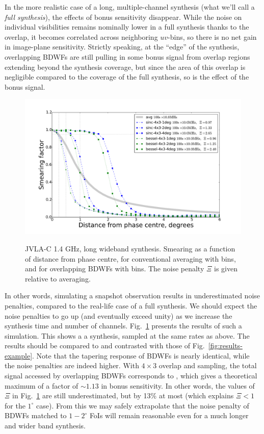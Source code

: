\documentclass[useAMS,usenatbib]{mn2e}
\begin{document}
In the more realistic case of a long, multiple-channel synthesis (what we'll call a \emph{full synthesis}), the
effects of bonus sensitivity disappear. While the noise on individual visibilities remains nominally lower in a full 
synthesis thanks to the overlap, it becomes correlated across neighboring $uv$-bins, so there is no net gain 
in image-plane sensitivity. Strictly speaking, at the ``edge'' of the synthesis, overlapping BDWFs are still pulling 
in some bonus signal from overlap regions extending beyond the synthesis coverage, but since the area of this 
overlap is negligible compared to the coverage of the full synthesis, so is the effect of the bonus signal.

\begin{figure}
\includegraphics[width=.9\textwidth]{./Figures/suppression-longsynth.pdf}\\
\caption{JVLA-C 1.4 GHz, long wideband synthesis. Smearing as a function of distance from phase centre, 
for conventional averaging with  bins, and for overlapping BDWFs with  bins.
The noise penalty $\Xi$ is given relative to  averaging.}
\label{fig:results-longsynth}
\end{figure}

In other words, simulating a snapshot observation results in underestimated noise penalties, compared to the
real-life case of a full synthesis. We should expect the noise penalties to go up (and eventually exceed unity) as 
we increase the synthesis time and number of channels. Fig.~\ref{fig:results-longsynth} presents the results of such 
a simulation. This shows a a  synthesis, sampled at the same rates as above. The results should be 
compared to and contrasted with those of Fig.~\ref{fig:results-example}. Note that the tapering response of BDWFs is 
nearly identical, while the noise penalties are indeed higher. With $4\times3$ overlap and  sampling, 
the total signal accessed by overlapping BDWFs corresponds to , which gives a theoretical maximum of 
a factor of $\sim1.13$ in bonus sensitivity. In other words, the values of $\Xi$ in Fig.~\ref{fig:results-longsynth}
are still underestimated, but by 13\% at most (which explains $\Xi<1$ for the $1^\circ$ case). From this we may safely
extrapolate that the noise penalty of BDWFs matched to $1-2^\circ$ FoIs will remain reasonable even for a much longer 
and wider band synthesis.
\end{document}
